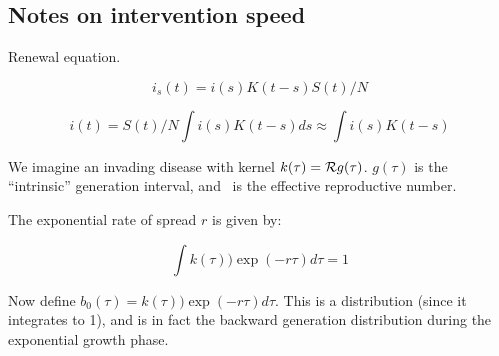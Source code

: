 \documentclass[12pt]{article}
\begin{document}
\subsection*{Notes on intervention speed}

Renewal equation.

$$i_s(t) = i(s) K(t-s) S(t)/N$$

$$i(t) = S(t)/N \int{i(s) K(t-s)} ds \approx \int{i(s) K(t-s)}$$


We imagine an invading disease with kernel $k(\tau) = {\cal R} g(\tau)$. 
$g(\tau)$ is the ``intrinsic'' generation interval, and \Rx\ is the effective reproductive number.

The exponential rate of spread $r$ is given by:

\begin{equation}
	\int{k(\tau)) \exp(-r\tau) d\tau} = 1
\end{equation}

Now define $b_0(\tau) = k(\tau)) \exp(-r\tau) d\tau$. This is a distribution (since it integrates to 1), and is in fact the backward generation distribution during the exponential growth phase.
\end{document}
